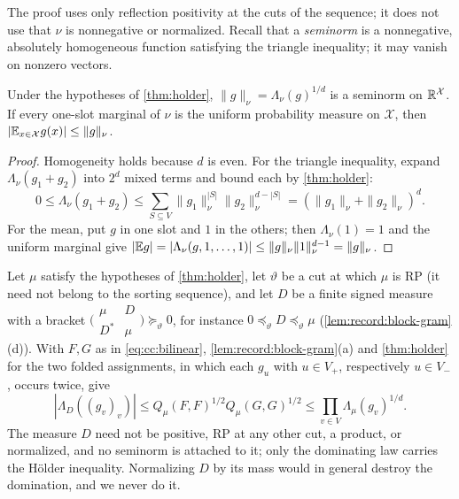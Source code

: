 The proof uses only reflection positivity at the cuts of the sequence; it does
not use that $\nu$ is nonnegative or normalized. Recall that a
\emph{seminorm} is a nonnegative, absolutely homogeneous function satisfying
the triangle inequality; it may vanish on nonzero vectors.

\begin{corollary}[Seminorm]\label{cor:seminorm}
Under the hypotheses of \cref{thm:holder}, $\|g\|_\nu=\Lambda_\nu(g)^{1/d}$ is a
seminorm on $\mathbb R^{\mathcal X}$. If every one-slot marginal of $\nu$ is the
uniform probability measure on $\mathcal X$, then
$|\mathbb E_{x\in\mathcal X}g(x)|\le\|g\|_\nu$.
\end{corollary}

\begin{proof}
Homogeneity holds because $d$ is even. For the triangle inequality, expand
$\Lambda_\nu(g_1+g_2)$ into $2^d$ mixed terms and bound each by
\cref{thm:holder}:
\[
 0\le\Lambda_\nu(g_1+g_2)\le\sum_{S\subseteq V}\|g_1\|_\nu^{|S|}\|g_2\|_\nu^{d-|S|}
 =(\|g_1\|_\nu+\|g_2\|_\nu)^d .
\]
For the mean, put $g$ in one slot and $1$ in the others; then $\Lambda_\nu(1)=1$
and the uniform marginal give
$|\mathbb E g|=|\Lambda_\nu(g,1,\dots,1)|\le\|g\|_\nu\|1\|_\nu^{d-1}=\|g\|_\nu$.
\end{proof}

\begin{remark}\label{rem:cc:mixed}
Let $\mu$ satisfy the hypotheses of \cref{thm:holder}, let $\vartheta$ be a cut
at which $\mu$ is RP (it need not belong to the sorting sequence), and let $D$
be a finite signed measure with a bracket
$\bigl(\begin{smallmatrix}\mu&D\\ D^*&\mu\end{smallmatrix}\bigr)\succeq_\vartheta0$,
for instance $0\preceq_\vartheta D\preceq_\vartheta\mu$
(\cref{lem:record:block-gram}(d)). With $F,G$ as in \eqref{eq:cc:bilinear},
\cref{lem:record:block-gram}(a) and \cref{thm:holder} for the two folded
assignments, in which each $g_u$ with $u\in V_+$, respectively $u\in V_-$,
occurs twice, give
\[
 |\Lambda_D((g_v)_v)|\le Q_\mu(F,F)^{1/2}Q_\mu(G,G)^{1/2}
 \le\prod_{v\in V}\Lambda_\mu(g_v)^{1/d}.
\]
The measure $D$ need not be positive, RP at any other cut, a product, or
normalized, and no seminorm is attached to it; only the dominating law
carries the H\"older inequality. Normalizing $D$ by its mass would in general
destroy the domination, and we never do it.
\end{remark}

